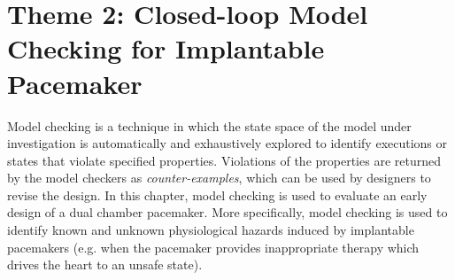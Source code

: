 



\chapter{Theme 2: Closed-loop Model Checking for Implantable Pacemaker}
\label{ModelChecking}
%

Model checking is a technique in which the state space of the model under investigation is automatically and exhaustively explored to identify executions or states that violate specified properties. 
Violations of the properties are returned by the model checkers as \emph{counter-examples}, which can be used by designers to revise the design. 
In this chapter, model checking is used to evaluate an early design of a dual chamber pacemaker. 
More specifically, model checking is used to identify known and unknown physiological hazards induced by implantable pacemakers (e.g. when the pacemaker provides inappropriate therapy which drives the heart to an unsafe state).  

